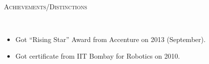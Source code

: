 \documentclass[9pt]{article}
\newenvironment{changemargin}[2]{%
  \begin{list}{}{%
    \setlength{\topsep}{0pt}%
    \setlength{\leftmargin}{#1}%
    \setlength{\rightmargin}{#2}%
    \setlength{\listparindent}{\parindent}%
    \setlength{\itemindent}{\parindent}%
    \setlength{\parsep}{\parskip}%
  }%
  \item[]}{\end{list}
}
\newcommand{\lineover}{
	\begin{changemargin}{-0.05in}{-0.05in}
		\vspace*{-8pt}
		\hrulefill \\
		\vspace*{-2pt}
	\end{changemargin}
}
\newcommand{\header}[1]{
	\begin{changemargin}{-0.5in}{-0.5in}
		\scshape{#1}\\
  	\lineover
	\end{changemargin}
}
\newenvironment{body} {
	\vspace*{-16pt}
	\begin{changemargin}{-0.25in}{-0.5in}
  }
	{\end{changemargin}
}
\begin{document}
\smallskip

\header{Achievements/Distinctions}
\begin{body}
	\vspace{14pt}
	\begin{itemize} \itemsep -0pt  %
            \item   Got ``Rising Star'' Award from Accenture on 2013 (September).
            \item   Got certificate from IIT Bombay for Robotics on 2010.
	\end{itemize}
\end{body}

\smallskip
\end{document}
